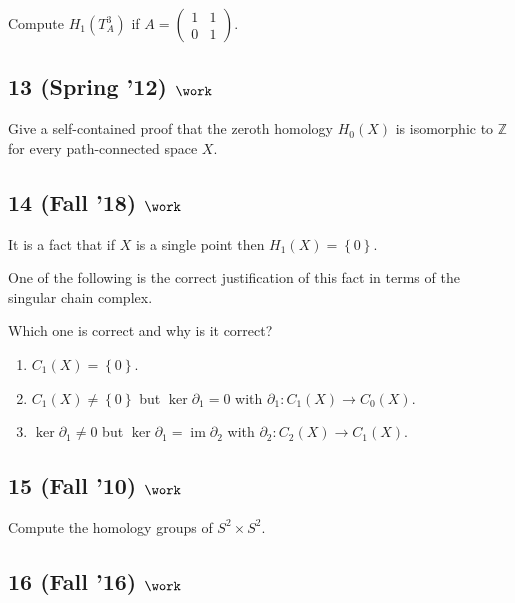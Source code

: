 Compute \(H_1 (T_A^3 )\) if
\(A=\left(\begin{array}{ll} 1 & 1 \\ 0 & 1 \end{array}\right).\)

\hypertarget{spring-12-work-2}{%
\subsection{\texorpdfstring{13 (Spring '12)
\(\work\)}{13 (Spring '12) \textbackslash work}}\label{spring-12-work-2}}

Give a self-contained proof that the zeroth homology \(H_0 (X)\) is
isomorphic to \({\mathbb{Z}}\) for every path-connected space \(X\).

\hypertarget{fall-18-work-5}{%
\subsection{\texorpdfstring{14 (Fall '18)
\(\work\)}{14 (Fall '18) \textbackslash work}}\label{fall-18-work-5}}

It is a fact that if \(X\) is a single point then
\(H_1 (X) = \left\{{0}\right\}\).

One of the following is the correct justification of this fact in terms
of the singular chain complex.

Which one is correct and why is it correct?

\begin{enumerate}
\def\labelenumi{\alph{enumi}.}
\item
  \(C_1 (X) = \left\{{0}\right\}\).
\item
  \(C_1 (X) \neq \left\{{0}\right\}\) but \(\ker \partial_1 = 0\) with
  \(\partial_1 : C_1 (X) \to C_0 (X)\).
\item
  \(\ker \partial_1 \neq 0\) but
  \(\ker \partial_1 = \operatorname{im}\partial_2\) with
  \(\partial_2 : C_2 (X) \to C_1 (X)\).
\end{enumerate}

\hypertarget{fall-10-work-1}{%
\subsection{\texorpdfstring{15 (Fall '10)
\(\work\)}{15 (Fall '10) \textbackslash work}}\label{fall-10-work-1}}

Compute the homology groups of \(S^2 \times S^2\).

\hypertarget{fall-16-work-5}{%
\subsection{\texorpdfstring{16 (Fall '16)
\(\work\)}{16 (Fall '16) \textbackslash work}}\label{fall-16-work-5}}

